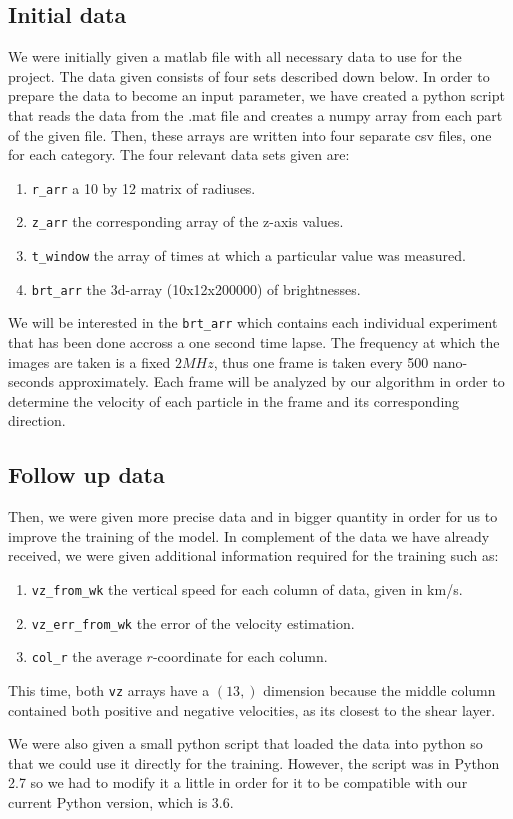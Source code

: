 \documentclass[10pt,conference]{IEEEtran}
\begin{document}
\subsection{Initial data}
We were initially given a matlab file with all necessary data to use for the project. The data given consists of four sets described down below. In order to prepare the data to become an input parameter, we have created a python script that reads the data from the .mat file and creates a numpy array from each part of the given file. Then, these arrays are written into four separate csv files, one for each category. The four relevant data sets given are:
\begin{enumerate}
  \item \texttt{r\_arr} a 10 by 12 matrix of radiuses.
  \item \texttt{z\_arr} the corresponding array of the z-axis values.
  \item \texttt{t\_window} the array of times at which a particular value was measured.
  \item \texttt{brt\_arr} the 3d-array (10x12x200000) of brightnesses.
\end{enumerate}
We will be interested in the \texttt{brt\_arr} which contains each individual experiment that has been done accross a one second time lapse. The frequency at which the images are taken is a fixed $2MHz$, thus one frame is taken every 500 nano-seconds approximately. Each frame will be analyzed by our algorithm in order to determine the velocity of each particle in the frame and its corresponding direction.
\subsection{Follow up data}
Then, we were given more precise data and in bigger quantity in order for us to improve the training of the model. In complement of the data we have already received, we were given additional information required for the training such as:
\begin{enumerate}
  \item \texttt{vz\_from\_wk} the vertical speed for each column of data, given in km/s.
  \item \texttt{vz\_err\_from\_wk} the error of the velocity estimation.
  \item \texttt{col\_r} the average $r$-coordinate for each column.
\end{enumerate}
This time, both \texttt{vz} arrays have a $(13,)$ dimension because the middle column contained both positive and negative velocities, as its closest to the shear layer.\par
We were also given a small python script that loaded the data into python so that we could use it directly for the training. However, the script was in Python 2.7 so we had to modify it a little in order for it to be compatible with our current Python version, which is 3.6.
\end{document}
